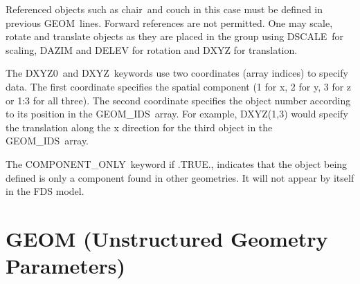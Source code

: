 \documentclass[12pt]{article}
\begin{document}
\noindent Referenced objects such as {\ct chair}\ and {\ct couch} in this case must be defined in
previous {GEOM}\ lines.  Forward references are not permitted.
One may scale, rotate and translate objects as they are placed in the group using
{\ct DSCALE}\, for scaling, {\ct DAZIM} and {\ct DELEV} for rotation and {\ct DXYZ} for translation.

The {\ct DXYZ0}\ and {\ct DXYZ}\ keywords use two coordinates (array indices) to specify data.
The first coordinate specifies the spatial component (1 for x, 2 for y, 3 for z or 1:3 for all three).
The second coordinate specifies the object number according to its position in the {\ct GEOM\_IDS}\ array.
For example,
DXYZ(1,3) would specify the translation along the x direction for the third object in the {\ct GEOM\_IDS}\ array.

The {\ct COMPONENT\_ONLY}\ keyword if .TRUE., indicates that the object being defined is only a component found in other geometries.
It will not appear by itself in the FDS model.

%

\section{\texorpdfstring{{\ct GEOM}}{GEOM} (Unstructured Geometry Parameters)}
\end{document}
